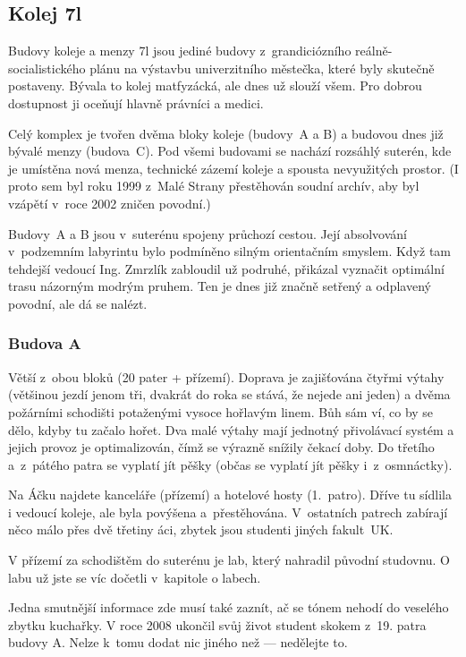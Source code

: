 \subsection{Kolej \17l}


Budovy koleje a menzy \17l jsou jediné budovy z~grandiciózního
re\-ál\-ně-so\-ci\-a\-lis\-tic\-kého plánu na výstavbu
univerzitního městečka, které byly skutečně postaveny. Bývala to
kolej matfyzácká, ale dnes už slouží všem. Pro dobrou dostupnost
ji oceňují hlavně právníci a medici.

Celý komplex je tvořen dvěma bloky koleje (budovy~A a B) a budovou
dnes již bývalé menzy (budova~C). Pod všemi budovami se nachází
rozsáhlý suterén, kde je umístěna nová menza, technické zázemí
koleje a spousta nevyužitých prostor. (I proto sem byl roku 1999
z~Malé Strany přestěhován soudní archív, aby byl vzápětí v~roce
2002 zničen povodní.)

Budovy~A a B jsou v~suterénu spojeny průchozí cestou. Její
absolvování v~podzemním labyrintu bylo podmíněno silným
orientačním smyslem.  Když tam tehdejší vedoucí Ing. Zmrzlík
zabloudil už podruhé, přikázal vyznačit optimální trasu názorným
modrým pruhem. Ten je dnes již značně setřený a odplavený povodní,
ale dá se nalézt.


\subsubsection{Budova A}

Větší z~obou bloků (20 pater + přízemí). Doprava je zajišťována
čtyřmi výtahy (většinou jezdí jenom tři, dvakrát do roka se stává,
že nejede ani jeden) a dvěma požárními schodišti potaženými vysoce
hořlavým linem. Bůh sám ví, co by se dělo, kdyby tu začalo hořet.
Dva malé výtahy mají jednotný přivolávací systém a jejich provoz
je optimalizován, čímž se výrazně snížily čekací doby. Do třetího
a~z~pátého patra se vyplatí jít pěšky (občas se vyplatí jít pěšky
i~z~osmnáctky).

Na Áčku najdete kanceláře (přízemí) a hotelové hosty (1.~patro).
Dříve tu sídlila i vedoucí koleje, ale byla povýšena
a~přestěhována. V~ostatních patrech zabírají něco málo přes dvě
třetiny \mfz{}áci, zbytek jsou studenti jiných fakult~UK.

V přízemí za schodištěm do suterénu je lab, který nahradil původní studovnu. O labu už jste se víc dočetli v~kapitole o labech.

Jedna smutnější informace zde musí také zaznít, ač se tónem nehodí do veselého zbytku kuchařky. V roce 2008 ukončil svůj život student skokem z~19. patra budovy A. Nelze k~tomu dodat nic jiného než --- nedělejte to.

